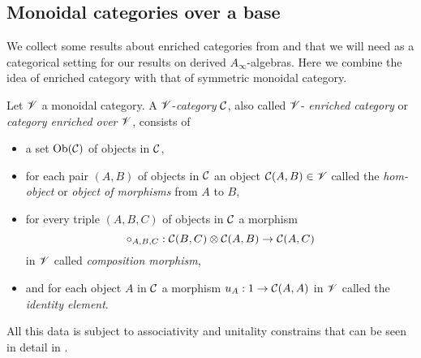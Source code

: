 \documentclass[Thesis.tex]{subfiles}
\begin{document}
\subsection{Monoidal categories over a base}




We collect some results about enriched categories from \cite{riehl} and \cite[\S 4.2]{whitehouse} that we will need as a categorical setting for our results on derived $A_\infty$-algebras. Here we combine the idea of enriched category with that of symmetric monoidal category.


\begin{defin}
Let $\mathscr{V}$ a monoidal category. A $\mathscr{V}$-\emph{category} ${\mathcal C}$, also called $\mathscr{V}$-\emph{
enriched category} or \emph{category enriched over} $\mathscr{V}$, consists of
\begin{itemize}
\item a set $\mathrm{Ob}({\mathcal C})$ of objects in ${\mathcal C}$,
\item for each pair $(A,B)$ of objects in ${\mathcal C}$ an object ${\mathcal C}(A,B)\in\mathscr{V}$ called the \emph{hom-object} or \emph{object of morphisms} from $A$ to $B$,
\item for every triple $(A,B,C)$ of objects in ${\mathcal C}$ a morphism
\[\circ_{A,B,C}:{\mathcal C}(B,C)\otimes{\mathcal C}(A,B)\to {\mathcal C}(A,C)\]
in $\mathscr{V}$ called \emph{composition morphism},
\item and for each object $A$ in ${\mathcal C}$ a morphism $u_A:1\to {\mathcal C}(A,A)$ in $\mathscr{V}$ called the \emph{identity element}. 
\end{itemize}
All this data is subject to associativity and unitality constrains that can be seen in detail in \cite{borceux}.
\end{defin}
\end{document}
